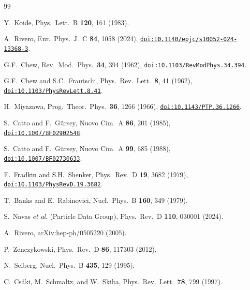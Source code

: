 \documentclass[11pt,a4paper]{article}
\begin{document}
\begin{thebibliography}{99}

  Y.~Koide,
  Phys.\ Lett.\ B \textbf{120}, 161 (1983).

  A.~Rivero,
  Eur.\ Phys.\ J.\ C \textbf{84}, 1058 (2024),
  \href{https://doi.org/10.1140/epjc/s10052-024-13368-3}%
    {\texttt{doi:10.1140/epjc/s10052-024-13368-3}}.

  G.F.~Chew,
  Rev.\ Mod.\ Phys.\ \textbf{34}, 394 (1962),
  \href{https://doi.org/10.1103/RevModPhys.34.394}%
    {\texttt{doi:10.1103/RevModPhys.34.394}}.

  G.F.~Chew and S.C.~Frautschi,
  Phys.\ Rev.\ Lett.\ \textbf{8}, 41 (1962),
  \href{https://doi.org/10.1103/PhysRevLett.8.41}%
    {\texttt{doi:10.1103/PhysRevLett.8.41}}.

  H.~Miyazawa,
  Prog.\ Theor.\ Phys.\ \textbf{36}, 1266 (1966),
  \href{https://doi.org/10.1143/PTP.36.1266}%
    {\texttt{doi:10.1143/PTP.36.1266}}.

  S.~Catto and F.~G\"ursey,
  Nuovo Cim.\ A \textbf{86}, 201 (1985),
  \href{https://doi.org/10.1007/BF02902548}%
    {\texttt{doi:10.1007/BF02902548}}.

  S.~Catto and F.~G\"ursey,
  Nuovo Cim.\ A \textbf{99}, 685 (1988),
  \href{https://doi.org/10.1007/BF02730633}%
    {\texttt{doi:10.1007/BF02730633}}.

  E.~Fradkin and S.H.~Shenker,
  Phys.\ Rev.\ D \textbf{19}, 3682 (1979),
  \href{https://doi.org/10.1103/PhysRevD.19.3682}%
    {\texttt{doi:10.1103/PhysRevD.19.3682}}.

  T.~Banks and E.~Rabinovici,
  Nucl.\ Phys.\ B \textbf{160}, 349 (1979).

  S.~Navas \textit{et al.} (Particle Data Group),
  Phys.\ Rev.\ D \textbf{110}, 030001 (2024).

  A.~Rivero,
  arXiv:hep-ph/0505220 (2005).

  P.~Zenczykowski,
  Phys.\ Rev.\ D \textbf{86}, 117303 (2012).

  N.~Seiberg,
  Nucl.\ Phys.\ B \textbf{435}, 129 (1995).

  C.~Cs\'aki, M.~Schmaltz, and W.~Skiba,
  Phys.\ Rev.\ Lett.\ \textbf{78}, 799 (1997).


\end{thebibliography}
\end{document}
